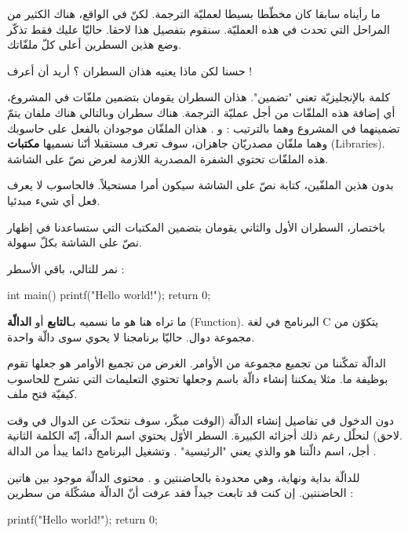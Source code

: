 ما رأيناه سابقا كان مخطّطا بسيطا لعمليّة الترجمة. لكنّ في الواقع، هناك الكثير من المراحل التي تحدث في هذه العمليّة. سنقوم بتفصيل هذا لاحقا. حاليّا عليك فقط تذكّر وضع هذين السطرين أعلى كلّ ملفّاتك.

\begin{question}
  حسنا لكن ماذا يعنيه هذان السطران ؟ أريد أن أعرف !
\end{question}

كلمة
 بالإنجليزيّة تعني "تضمين". هذان السطران يقومان بتضمين ملفّات في المشروع، أي إضافة هذه الملفّات من أجل عمليّة الترجمة. هناك سطران وبالتالي هناك ملفان يتمّ تضمينهما في المشروع وهما بالترتيب :
 و
.
هذان الملفّان موجودان بالفعل على حاسوبك وهما ملفّان مصدريّان جاهزان، سوف تعرف مستقبلا أنّنا نسميها
\textbf{مكتبات}
(\textenglish{Libraries}).
 هذه الملفّات تحتوي الشفرة المصدرية اللازمة لعرض نصّ على الشاشة.

 بدون هذين الملفّين، كتابة نصّ على الشاشة سيكون أمرا مستحيلاً. فالحاسوب لا يعرف فعل أي شيء مبدئيا.

 باختصار، السطران الأول والثاني يقومان بتضمين المكتبات التي ستساعدنا في إظهار نصّ على الشاشة بكلّ سهولة.

 نمر للتالي، باقي الأسطر :
 
\begin{Csource}
int main()
{
    printf("Hello world!\n");
    return 0;
}
\end{Csource}

ما تراه هنا هو ما نسميه بـ\textbf{التابع}
أو
\textbf{الدالّة}
(\textenglish{Function}).
 البرنامج في لغة
\textenglish{C}
 يتكوّن من مجموعة دوال. حاليّا برنامجنا لا يحوي سوى دالّة واحدة.

الدالّة تمكّننا من تجميع مجموعة من الأوامر. الغرض من تجميع الأوامر هو جعلها تقوم بوظيفة ما. مثلا يمكننا إنشاء دالّة باسم
 وجعلها تحتوي التعليمات التي تشرح للحاسوب كيفيّة فتح ملف.

 دون الدخول في تفاصيل إنشاء الدالّة (الوقت مبكّر، سوف نتحدّث عن الدوال في وقت لاحق) لنحلّل رغم ذلك أجزائه الكبيرة. السطر الأوّل يحتوي اسم الدالّة، إنّه الكلمة الثانية.\\
 أجل، اسم دالّتنا هو
والذي يعني
"الرئيسية"
. وتشغيل البرنامج دائما يبدأ من الدالة
.

للدالّة بداية ونهاية، وهي محدودة بالحاضنتين
\InlineCode{\{}
و
\InlineCode{\}}.
محتوى الدالّة موجود بين هاتين الحاضنتين. إن كنت قد تابعت جيداً فقد عرفت أنّ الدالّة مشكّلة من سطرين :

\begin{Csource}
printf("Hello world!\n");
return 0;
\end{Csource}


